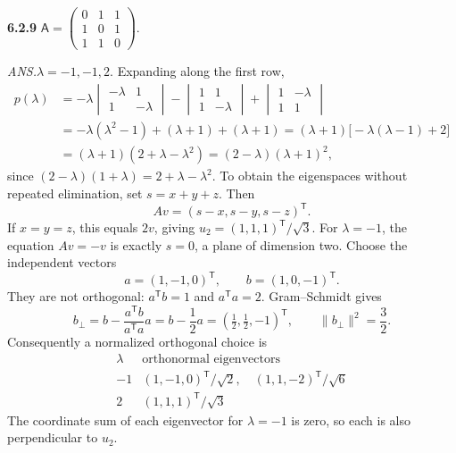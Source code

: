 \par\bigskip
\noindent\textbf{6.2.9}\quad
$\mathsf{A}=\begin{pmatrix}0&1&1\\1&0&1\\1&1&0\end{pmatrix}$.
\par\nobreak\hfill\emph{ANS.}\enspace $\lambda=-1,-1,2$.
\solution
Expanding along the first row,
\begin{align*}
p(\lambda)
&=-\lambda\begin{vmatrix}-\lambda&1\\1&-\lambda\end{vmatrix}
-\begin{vmatrix}1&1\\1&-\lambda\end{vmatrix}
+\begin{vmatrix}1&-\lambda\\1&1\end{vmatrix}\\
&=-\lambda(\lambda^2-1)+(\lambda+1)+(\lambda+1)
=(\lambda+1)\bigl[-\lambda(\lambda-1)+2\bigr]\\
&=(\lambda+1)(2+\lambda-\lambda^2)=(2-\lambda)(\lambda+1)^2,
\end{align*}
since $(2-\lambda)(1+\lambda)=2+\lambda-\lambda^2$.
To obtain the eigenspaces without repeated elimination, set
$s=x+y+z$. Then
\[
Av=(s-x,s-y,s-z)^{\mathsf T}.
\]
If $x=y=z$, this equals $2v$, giving
$u_2=(1,1,1)^{\mathsf T}/\sqrt3$.
For $\lambda=-1$, the equation $Av=-v$ is exactly $s=0$, a plane of
dimension two. Choose the independent vectors
\[
a=(1,-1,0)^{\mathsf T},\qquad b=(1,0,-1)^{\mathsf T}.
\]
They are not orthogonal: $a^{\mathsf T}b=1$ and
$a^{\mathsf T}a=2$. Gram--Schmidt gives
\[
b_\perp=b-\frac{a^{\mathsf T}b}{a^{\mathsf T}a}a
=b-\frac12a=(\tfrac12,\tfrac12,-1)^{\mathsf T},\qquad
\|b_\perp\|^2=\frac32.
\]
Consequently a normalized orthogonal choice is
\[
\boxed{\begin{array}{c|c}
\lambda&\text{orthonormal eigenvectors}\\\hline
-1&(1,-1,0)^{\mathsf T}/\sqrt2,\quad(1,1,-2)^{\mathsf T}/\sqrt6\\
2&(1,1,1)^{\mathsf T}/\sqrt3
\end{array}}
\]
The coordinate sum of each eigenvector for $\lambda=-1$ is zero, so each
is also perpendicular to $u_2$.


